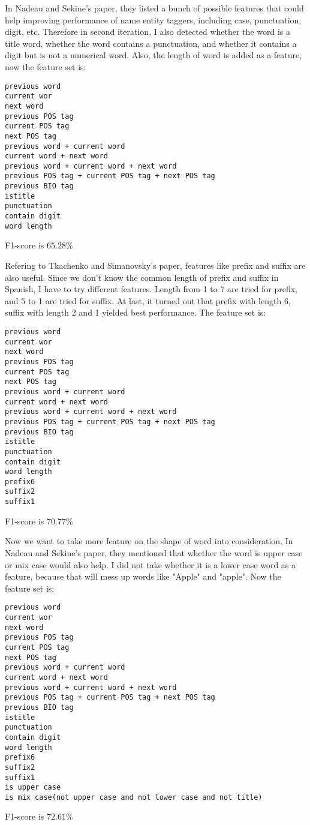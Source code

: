\documentclass[10pt,twocolumn,letterpaper]{article}
\begin{document}
\par In Nadeau and Sekine's paper\cite{Survey}, they listed a bunch of possible features that could help improving performance of name entity taggers, including case, punctuation, digit, etc. Therefore in second iteration, I also detected whether the word is a title word, whether the word contains a punctuation, and whether it contains a digit but is not a numerical word. Also, the length of word is added as a feature, now the feature set is:
\begin{lstlisting}
previous word
current wor
next word
previous POS tag
current POS tag
next POS tag
previous word + current word
current word + next word
previous word + current word + next word
previous POS tag + current POS tag + next POS tag
previous BIO tag
istitle
punctuation
contain digit
word length
\end{lstlisting}
F1-score is $65.28\%$

\par Refering to Tkachenko and Simanovsky's paper\cite{Explore}, features like prefix and suffix are also useful. Since we don't know the common length of prefix and suffix in Spanish, I have to try different features. Length from 1 to 7 are tried for prefix, and 5 to 1 are tried for suffix. At last, it turned out that prefix with length 6, suffix with length 2 and 1 yielded best performance. The feature set is:
\begin{lstlisting}
previous word
current wor
next word
previous POS tag
current POS tag
next POS tag
previous word + current word
current word + next word
previous word + current word + next word
previous POS tag + current POS tag + next POS tag
previous BIO tag
istitle
punctuation
contain digit
word length
prefix6
suffix2
suffix1
\end{lstlisting}
F1-score is $70.77\%$

\par Now we want to take more feature on the shape of word into consideration. In Nadeau and Sekine's paper, they mentioned that whether the word is upper case or mix case would also help. I did not take whether it is a lower case word as a feature, because that will mess up words like "Apple" and "apple". Now the feature set is:
\begin{lstlisting}
previous word
current wor
next word
previous POS tag
current POS tag
next POS tag
previous word + current word
current word + next word
previous word + current word + next word
previous POS tag + current POS tag + next POS tag
previous BIO tag
istitle
punctuation
contain digit
word length
prefix6
suffix2
suffix1
is upper case
is mix case(not upper case and not lower case and not title)
\end{lstlisting}
F1-score is $72.61\%$
\end{document}
